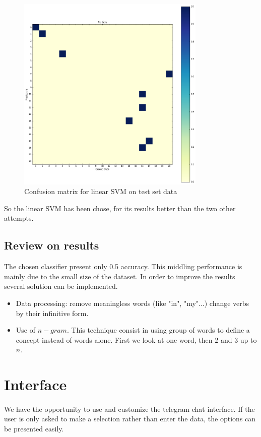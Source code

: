 \begin{figure}[H]
	\centering
	\includegraphics[width=9cm]{classifier_svm_linear_test}
	\caption{Confusion matrix for linear SVM on test set data}
	\label{svm_test}
\end{figure}

So the linear SVM has been chose, for its results better than the two other attempts. 

\subsection{Review on results}

The chosen classifier present only 0.5 accuracy. This middling performance is mainly due to the small size of the dataset. In order to improve the results several solution can be implemented.
\begin{itemize}
	\item Data processing: remove meaningless words (like "in", "my"...) change verbs by their infinitive form.
	\item Use of $n-gram$. This technique consist in using group of words to define a concept instead of words alone. First we look at one word, then 2 and 3 up to $n$.
\end{itemize}

\section{Interface}

\paragraph{}
We	have	the	opportunity	to	use	and	customize	the	telegram	chat	interface.	If	the	user	is	only	asked	to	make	a	selection	rather	than	enter	the	data,	the	options	can	be	presented	easily.	

